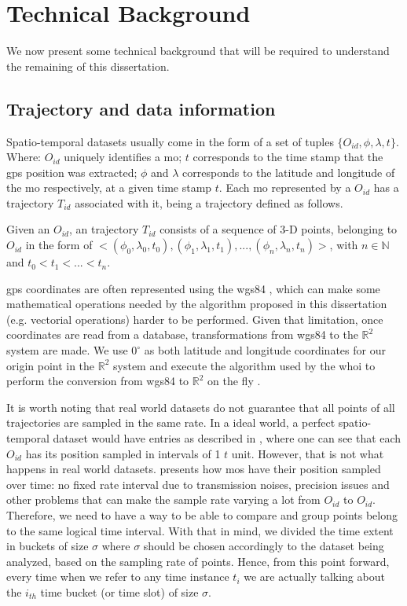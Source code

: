 \chapter{Technical Background}
\label{chp:techbackground}

We now present some technical background that will be required to understand the remaining of this dissertation.

\section{Trajectory and data information}
\label{sec:tech_data}

Spatio-temporal datasets usually come in the form of a set of tuples $\{O_{id}, \phi, \lambda, t\}$. Where: $O_{id}$
uniquely identifies a \ac{mo}; $t$ corresponds to the time stamp that the \ac{gps} position was extracted; $\phi$ and
$\lambda$ corresponds to the latitude and longitude of the \ac{mo} respectively, at a given time stamp $t$. Each \ac{mo}
represented by a $O_{id}$ has a trajectory $T_{id}$ associated with it, being a trajectory defined as follows.

\begin{Def}
Given an $O_{id}$, an trajectory $T_{id}$ consists of a sequence of 3-D points, belonging to $O_{id}$ in the form of
$<(\phi_0, \lambda_0, t_0), (\phi_1, \lambda_1, t_1), ..., (\phi_n, \lambda_n, t_n)>$, with $n \in \mathbb{N}$ and $t_0
< t_1 < ... < t_n$.
\end{Def}

\ac{gps} coordinates are often represented using the \ac{wgs84} \citep{wgs84}, which can make some mathematical
operations needed by the algorithm proposed in this dissertation (e.g. vectorial operations) harder to be performed.
Given that limitation, once coordinates are read from a database, transformations from \ac{wgs84} to the $\mathbb{R}^2$
system are made. We use $0^\circ$ as both latitude and longitude coordinates for our origin point in the $\mathbb{R}^2$
system and execute the algorithm used by the \ac{whoi} to perform the conversion from \ac{wgs84} to $\mathbb{R}^2$ on
the fly \citep{latlogtoxy}.

It is worth noting that real world datasets do not guarantee that all points of all trajectories are sampled in the same
rate. In a ideal world, a perfect spatio-temporal dataset would have entries as described in ,
where one can see that each $O_{id}$ has its position sampled in intervals of 1 $t$ unit. However, that is not what
happens in real world datasets.  presents how \acp{mo} have their position sampled over time: no
fixed rate interval due to transmission noises, precision issues and other problems that can make the sample rate
varying a lot from $O_{id}$ to $O_{id}$. Therefore, we need to have a way to be able to compare and group points belong
to the same logical time interval. With that in mind, we divided the time extent in buckets of size $\sigma$ where
$\sigma$ should be chosen accordingly to the dataset being analyzed, based on the sampling rate of points. Hence, from
this point forward, every time when we refer to any time instance $t_i$ we are actually talking about the $i_{th}$ time
bucket (or time slot) of size $\sigma$.

